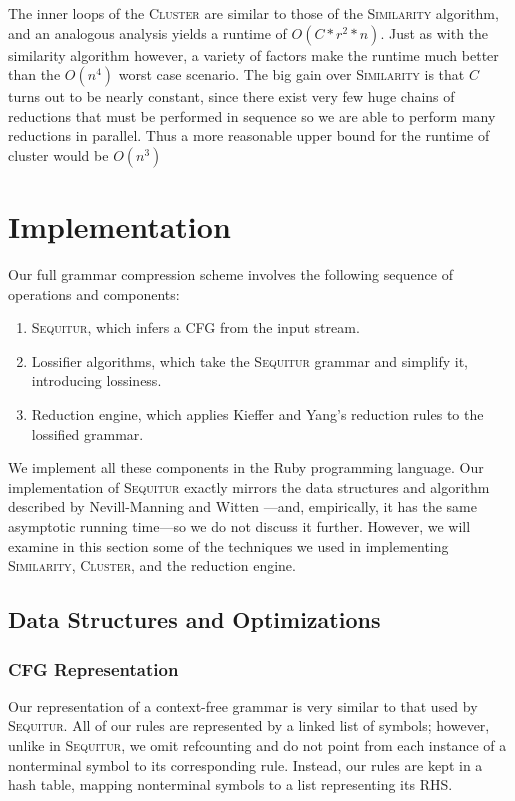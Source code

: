 \documentclass[11pt]{article}
\newcommand{\Sequitur}{\textsc{Sequitur}\xspace}
\newcommand{\Similarity}{\textsc{Similarity}\xspace}
\newcommand{\Cluster}{\textsc{Cluster}\xspace}
\begin{document}
The inner loops of the \Cluster are similar to those of the \Similarity
algorithm, and an analogous analysis yields a runtime of $\boxed{O(C*r^2*n)}$. 
Just as with the
similarity algorithm however, a variety of factors make the runtime much better than
the $\boxed{O(n^4)}$ worst case scenario.  The big gain over \Similarity
is that $C$ turns out to be nearly constant, since there exist very few
huge chains of reductions that must be performed in sequence
so we are able to perform many reductions in parallel.
Thus a more reasonable upper bound for the runtime of cluster would
be $\boxed{O(n^3)}$

\section{Implementation}

Our full grammar compression scheme involves the following sequence of
operations and components:
\begin{enumerate}
  \item \Sequitur, which infers a CFG from the input stream.
  \item Lossifier algorithms, which take the \Sequitur grammar and simplify it,
    introducing lossiness.
  \item Reduction engine, which applies Kieffer and Yang's reduction rules to
    the lossified grammar.
\end{enumerate}

We implement all these components in the Ruby programming language.  Our
implementation of \Sequitur exactly mirrors the data structures and algorithm
described by Nevill-Manning and Witten \cite{sequitur}---and, empirically, it
has the same asymptotic running time---so we do not discuss it further.
However, we will examine in this section some of the techniques we used in
implementing \Similarity, \Cluster, and the reduction engine.

\subsection{Data Structures and Optimizations}

\subsubsection{CFG Representation}

Our representation of a context-free grammar is very similar to that used by
\Sequitur.  All of our rules are represented by a linked list of symbols;
however, unlike in \Sequitur, we omit refcounting and do not point from each
instance of a nonterminal symbol to its corresponding rule.  Instead, our rules
are kept in a hash table, mapping nonterminal symbols to a list representing
its RHS.
\end{document}
